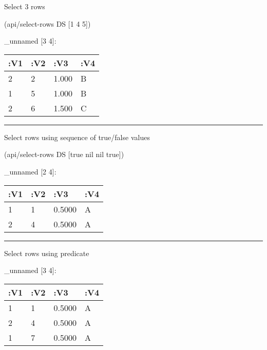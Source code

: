 \documentclass[]{article}
\newenvironment{Shaded}{\begin{snugshade}}{\end{snugshade}}
\newcommand{\KeywordTok}[1]{\textcolor[rgb]{0.13,0.29,0.53}{\textbf{#1}}}
\newcommand{\DecValTok}[1]{\textcolor[rgb]{0.00,0.00,0.81}{#1}}
\newcommand{\VariableTok}[1]{\textcolor[rgb]{0.00,0.00,0.00}{#1}}
\newcommand{\AttributeTok}[1]{\textcolor[rgb]{0.77,0.63,0.00}{#1}}
\newcommand{\NormalTok}[1]{#1}
\begin{document}
Select 3 rows

\begin{Shaded}
\begin{Highlighting}[]
\NormalTok{(api/select-rows DS [}\DecValTok{1} \DecValTok{4} \DecValTok{5}\NormalTok{])}
\end{Highlighting}
\end{Shaded}

\_unnamed {[}3 4{]}:

\begin{longtable}[]{@{}llll@{}}
\toprule
:V1 & :V2 & :V3 & :V4\tabularnewline
\midrule
\endhead
2 & 2 & 1.000 & B\tabularnewline
1 & 5 & 1.000 & B\tabularnewline
2 & 6 & 1.500 & C\tabularnewline
\bottomrule
\end{longtable}

\begin{center}\rule{0.5\linewidth}{0.5pt}\end{center}

Select rows using sequence of true/false values

\begin{Shaded}
\begin{Highlighting}[]
\NormalTok{(api/select-rows DS [}\VariableTok{true} \VariableTok{nil} \VariableTok{nil} \VariableTok{true}\NormalTok{])}
\end{Highlighting}
\end{Shaded}

\_unnamed {[}2 4{]}:

\begin{longtable}[]{@{}llll@{}}
\toprule
:V1 & :V2 & :V3 & :V4\tabularnewline
\midrule
\endhead
1 & 1 & 0.5000 & A\tabularnewline
2 & 4 & 0.5000 & A\tabularnewline
\bottomrule
\end{longtable}

\begin{center}\rule{0.5\linewidth}{0.5pt}\end{center}

Select rows using predicate

\begin{Shaded}
\end{Shaded}

\_unnamed {[}3 4{]}:

\begin{longtable}[]{@{}llll@{}}
\toprule
:V1 & :V2 & :V3 & :V4\tabularnewline
\midrule
\endhead
1 & 1 & 0.5000 & A\tabularnewline
2 & 4 & 0.5000 & A\tabularnewline
1 & 7 & 0.5000 & A\tabularnewline
\bottomrule
\end{longtable}
\end{document}
